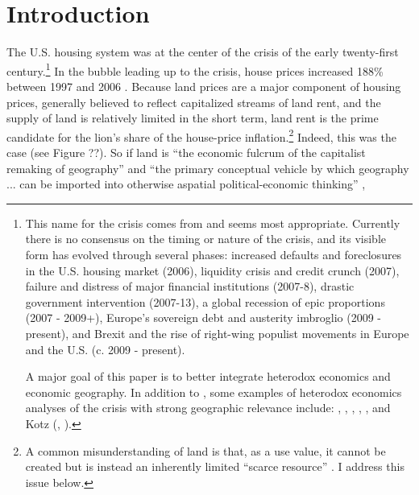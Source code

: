 \begin{comment}
With myMemoir, don't put title, etc. in LyX.
\end{comment}


\section{Introduction}

The U.S. housing system was at the center of the crisis of the early
twenty-first century.\footnote{This name for the crisis comes from \citet{Dumenil_2012_Crisis} and
seems most appropriate. Currently there is no consensus on the timing
or nature of the crisis, and its visible form has evolved through
several phases: increased defaults and foreclosures in the U.S. housing
market (2006), liquidity crisis and credit crunch (2007), failure
and distress of major financial institutions (2007-8), drastic government
intervention (2007-13), a global recession of epic proportions (2007
- 2009+), Europe's sovereign debt and austerity imbroglio (2009 -
present), and Brexit and the rise of right-wing populist movements
in Europe and the U.S. (c. 2009 - present).

A major goal of this paper is to better integrate heterodox economics
and economic geography. In addition to \citeauthor{Dumenil_2012_Crisis},
some examples of heterodox economics analyses of the crisis with strong
geographic relevance include: \citet{foley2009theanatomy}, \citet{hudson2012thebubble},
\citet{lucarelli2012financialization}, \citet{palan2013thefinancial},
\citet{pettifor2013thenext}, and Kotz (\citeyear{kotz2013thecurrent},
\citeyear{kotz2015capitalism}).} In the bubble leading up to the crisis, house prices increased 188\%
between 1997 and 2006 \citep{levitin2012explaining}. Because land
prices are a major component of housing prices, generally believed
to reflect capitalized streams of land rent, and the supply of land
is relatively limited in the short term, land rent is the prime candidate
for the lion's share of the house-price inflation.\footnote{A common misunderstanding of land is that, as a use value, it cannot
be created but is instead an inherently limited ``scarce resource''
\citep[806]{elden2010landterrain}. I address this issue below.} Indeed, this was the case (see Figure ??). So if land is ``the economic
fulcrum of the capitalist remaking of geography'' \citep[1]{ward2016virtual}
and ``the primary conceptual vehicle by which geography ... can be
imported into otherwise aspatial political-economic thinking'' \citep[136]{christophers2016forreal},
